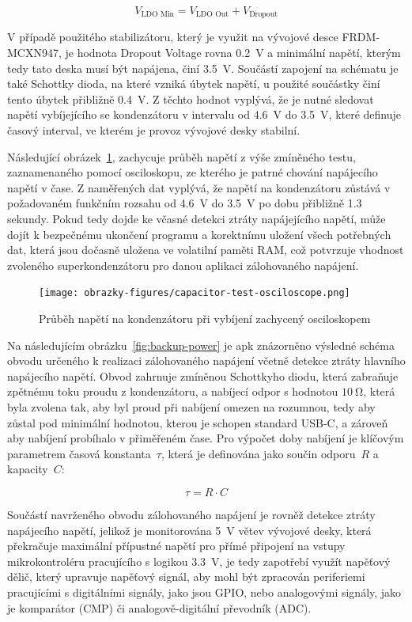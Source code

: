 \[
V_{\text{LDO Min}} = V_{\text{LDO Out}} + V_{\text{Dropout}}
\]

V případě použitého stabilizátoru, který je využit na vývojové desce FRDM-MCXN947, je hodnota Dropout Voltage rovna \SI{0.2}{\volt} a minimální napětí, kterým tedy tato deska musí být napájena, činí \SI{3.5}{\volt}. Součástí zapojení na schématu je také Schottky dioda, na které vzniká úbytek napětí, u použité součástky činí tento úbytek přibližně \SI{0.4}{\volt}. Z těchto hodnot vyplývá, že je nutné sledovat napětí vybíjejícího se kondenzátoru v intervalu od \SI{4.6}{\volt} do \SI{3.5}{\volt}, které definuje časový interval, ve kterém je provoz vývojové desky stabilní.

Následující obrázek~\ref{fig:test-capacitors}, zachycuje průběh napětí z výše zmíněného testu, zaznamenaného pomocí osciloskopu, ze kterého je patrné chování napájecího napětí v čase. Z naměřených dat vyplývá, že napětí na kondenzátoru zůstává v požadovaném funkčním rozsahu od \SI{4.6}{\volt} do \SI{3.5}{\volt} po dobu přibližně 1.3 sekundy. Pokud tedy dojde ke včasné detekci ztráty napájejícího napětí, může dojít k bezpečnému ukončení programu a korektnímu uložení všech potřebných dat, která jsou dočasně uložena ve volatilní paměti RAM, což potvrzuje vhodnost zvoleného superkondenzátoru pro danou aplikaci zálohovaného napájení.

\begin{figure}[h]
    \centering
    \texttt{[image: obrazky-figures/capacitor-test-osciloscope.png]}
    
    \caption{Průběh napětí na kondenzátoru při vybíjení zachycený osciloskopem}
    \label{fig:test-capacitors}
\end{figure}



Na následujícím obrázku~\ref{fig:backup-power} je apk znázorněno výsledné schéma obvodu určeného k realizaci zálohovaného napájení včetně detekce ztráty hlavního napájecího napětí. Obvod zahrnuje zmíněnou Schottkyho diodu, která zabraňuje zpětnému toku proudu z kondenzátoru, a nabíjecí odpor s hodnotou $\SI{10}{\ohm}$, která byla zvolena tak, aby byl proud při nabíjení omezen na rozumnou, tedy aby zůstal pod minimální hodnotou, kterou je schopen standard USB-C, a zároveň aby nabíjení probíhalo v přiměřeném čase. Pro výpočet doby nabíjení je klíčovým parametrem časová konstanta~$\tau$, která je definována jako součin odporu~$R$ a kapacity~$C$:

\[
\tau = R \cdot C
\]

Součástí navrženého obvodu zálohovaného napájení je rovněž detekce ztráty napájecího napětí, jelikož je monitorována \SI{5}{\volt} větev vývojové desky, která překračuje maximální přípustné napětí pro přímé připojení na vstupy mikrokontroléru pracujícího s logikou \SI{3.3}{\volt}, je tedy zapotřebí využít napěťový dělič, který upravuje napěťový signál, aby mohl být zpracován periferiemi pracujícími s digitálními signály, jako jsou GPIO, nebo analogovými signály, jako je komparátor (CMP) či analogově-digitální převodník (ADC).

